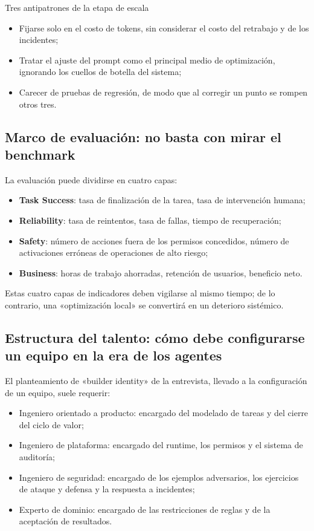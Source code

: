 \documentclass[a4paper]{article}
\begin{document}
\begin{warningbox}{Tres antipatrones de la etapa de escala}
\begin{itemize}
    \item Fijarse solo en el costo de tokens, sin considerar el costo del retrabajo y de los incidentes;
    \item Tratar el ajuste del prompt como el principal medio de optimización, ignorando los cuellos de botella del sistema;
    \item Carecer de pruebas de regresión, de modo que al corregir un punto se rompen otros tres.
\end{itemize}
\end{warningbox}

\subsection{Marco de evaluación: no basta con mirar el benchmark}

La evaluación puede dividirse en cuatro capas:
\begin{itemize}
    \item \textbf{Task Success}: tasa de finalización de la tarea, tasa de intervención humana;
    \item \textbf{Reliability}: tasa de reintentos, tasa de fallas, tiempo de recuperación;
    \item \textbf{Safety}: número de acciones fuera de los permisos concedidos, número de activaciones erróneas de operaciones de alto riesgo;
    \item \textbf{Business}: horas de trabajo ahorradas, retención de usuarios, beneficio neto.
\end{itemize}

Estas cuatro capas de indicadores deben vigilarse al mismo tiempo; de lo contrario, una «optimización local» se convertirá en un deterioro sistémico.

\subsection{Estructura del talento: cómo debe configurarse un equipo en la era de los agentes}

El planteamiento de «builder identity» de la entrevista, llevado a la configuración de un equipo, suele requerir:
\begin{itemize}
    \item Ingeniero orientado a producto: encargado del modelado de tareas y del cierre del ciclo de valor;
    \item Ingeniero de plataforma: encargado del runtime, los permisos y el sistema de auditoría;
    \item Ingeniero de seguridad: encargado de los ejemplos adversarios, los ejercicios de ataque y defensa y la respuesta a incidentes;
    \item Experto de dominio: encargado de las restricciones de reglas y de la aceptación de resultados.
\end{itemize}
\end{document}
